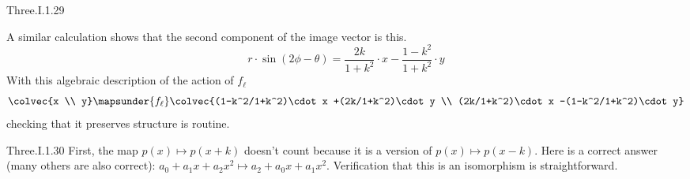\begin{ans}{Three.I.1.29}
\begin{exparts}
\begin{equation*}
          \end{equation*}
          A similar calculation shows that the second component of the image
          vector is this.
          \begin{equation*}
            r\cdot\sin(2\phi-\theta)=\frac{2k}{1+k^2}\cdot x
                                     -\frac{1-k^2}{1+k^2}\cdot y
          \end{equation*}
          With this algebraic description of the action of $f_\ell$
          \begin{equation*}
            \colvec{x \\ y}
             \mapsunder{f_\ell}
            \colvec{(1-k^2/1+k^2)\cdot x
                                     +(2k/1+k^2)\cdot y \\
                   (2k/1+k^2)\cdot x
                                     -(1-k^2/1+k^2)\cdot y}
          \end{equation*}
          checking that it preserves structure is routine.
      \end{exparts}
    
\end{ans}
\begin{ans}{Three.I.1.30}
       First, the map $p(x)\mapsto p(x+k)$ doesn't count
       because it is a version of $p(x)\mapsto p(x-k)$.
       Here is a correct answer (many others are also correct):
       \( a_0+a_1x+a_2x^2 \mapsto a_2+a_0x+a_1x^2 \).
       Verification that this is an isomorphism is straightforward.
    
\end{ans}
